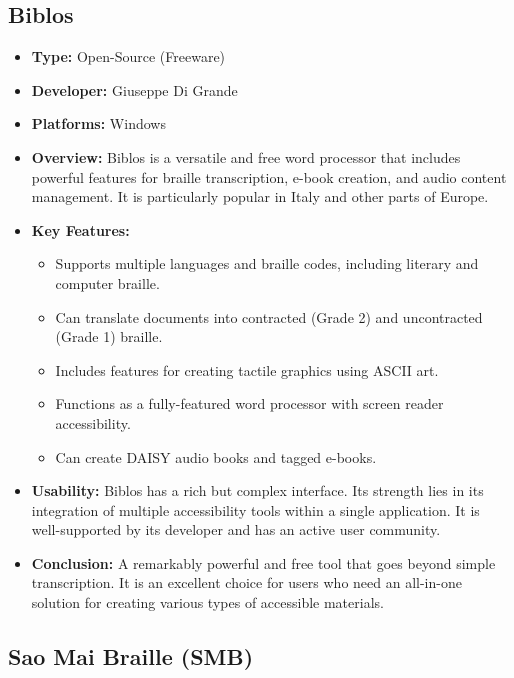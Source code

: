 \subsection{Biblos}
\label{sub:biblos}

\begin{itemize}
	\item \textbf{Type:} Open-Source (Freeware)
	\item \textbf{Developer:} Giuseppe Di Grande
	\item \textbf{Platforms:} Windows
	\item \textbf{Overview:} Biblos \supercite{Biblos} is a versatile and free word processor that includes powerful features for braille transcription, e-book creation, and audio content management. It is particularly popular in Italy and other parts of Europe.
	\item \textbf{Key Features:}
	      \begin{itemize}
		      \item Supports multiple languages and braille codes, including literary and computer braille.
		      \item Can translate documents into contracted (Grade 2) and uncontracted (Grade 1) braille.
		      \item Includes features for creating \gls{tactile} graphics using ASCII art.
		      \item Functions as a fully-featured word processor with screen reader accessibility.
		      \item Can create DAISY audio books and tagged e-books.
	      \end{itemize}
	\item \textbf{Usability:} Biblos has a rich but complex interface. Its strength lies in its integration of multiple accessibility tools within a single application. It is well-supported by its developer and has an active user community.
	\item \textbf{Conclusion:} A remarkably powerful and free tool that goes beyond simple transcription. It is an excellent choice for users who need an all-in-one solution for creating various types of accessible materials.
\end{itemize}

\subsection{Sao Mai Braille (SMB)}
\label{sub:sao-mai-braille-smb}

